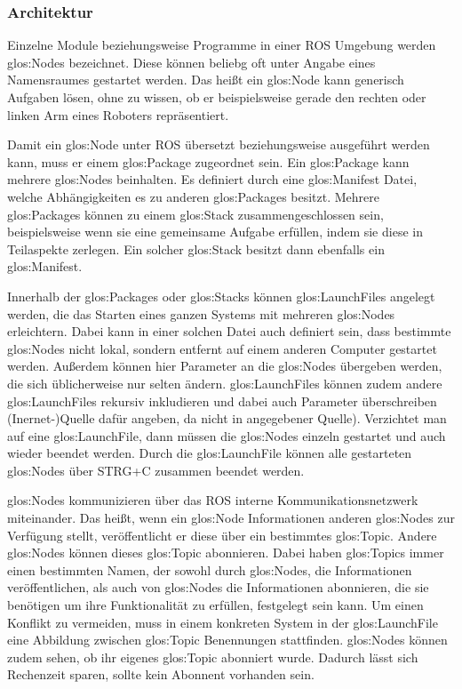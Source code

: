 \subsubsection{Architektur}

Einzelne Module beziehungsweise Programme in einer \gls{ROS} Umgebung werden \glspl{glos:Node} bezeichnet. Diese können beliebg oft unter Angabe eines Namensraumes gestartet werden. Das heißt ein \gls{glos:Node} kann generisch Aufgaben lösen, ohne zu wissen, ob er beispielsweise gerade den rechten oder linken Arm eines Roboters repräsentiert.

Damit ein \gls{glos:Node} unter \gls{ROS} übersetzt beziehungsweise ausgeführt werden kann, muss er einem \gls{glos:Package} zugeordnet sein. Ein \gls{glos:Package} kann mehrere \glspl{glos:Node} beinhalten. Es definiert durch eine \gls{glos:Manifest} Datei, welche Abhängigkeiten es zu anderen \glspl{glos:Package} besitzt. Mehrere \glspl{glos:Package} können zu einem \gls{glos:Stack} zusammengeschlossen sein, beispielsweise wenn sie eine gemeinsame Aufgabe erfüllen, indem sie diese in Teilaspekte zerlegen. Ein solcher \gls{glos:Stack} besitzt dann ebenfalls ein \gls{glos:Manifest}.

Innerhalb der \glspl{glos:Package} oder \glspl{glos:Stack} können \glspl{glos:LaunchFile} angelegt werden, die das Starten eines ganzen Systems mit mehreren \glspl{glos:Node} erleichtern. Dabei kann in einer solchen Datei auch definiert sein, dass bestimmte \glspl{glos:Node} nicht lokal, sondern entfernt auf einem anderen Computer gestartet werden. Außerdem können hier Parameter an die \glspl{glos:Node} übergeben werden, die sich üblicherweise nur selten ändern. \glspl{glos:LaunchFile} können zudem andere \glspl{glos:LaunchFile} rekursiv inkludieren und dabei auch Parameter überschreiben{\color{red} (Inernet-)Quelle dafür angeben, da nicht in angegebener Quelle)}. Verzichtet man auf eine \gls{glos:LaunchFile}, dann müssen die \glspl{glos:Node} einzeln gestartet und auch wieder beendet werden. Durch die \gls{glos:LaunchFile} können alle gestarteten \glspl{glos:Node} über STRG+C zusammen beendet werden.

\glspl{glos:Node} kommunizieren über das \gls{ROS} interne Kommunikationsnetzwerk miteinander. Das heißt, wenn ein \gls{glos:Node} Informationen anderen \glspl{glos:Node} zur Verfügung stellt, veröffentlicht er diese über ein bestimmtes \gls{glos:Topic}. Andere \glspl{glos:Node} können dieses \gls{glos:Topic} abonnieren. Dabei haben \glspl{glos:Topic} immer einen bestimmten Namen, der sowohl durch \glspl{glos:Node}, die Informationen veröffentlichen, als auch von \glspl{glos:Node} die Informationen abonnieren, die sie benötigen um ihre Funktionalität zu erfüllen, festgelegt sein kann. Um einen Konflikt zu vermeiden, muss in einem konkreten System in der \gls{glos:LaunchFile} eine Abbildung zwischen \gls{glos:Topic} Benennungen stattfinden. \glspl{glos:Node} können zudem sehen, ob ihr eigenes \gls{glos:Topic} abonniert wurde. Dadurch lässt sich Rechenzeit sparen, sollte kein Abonnent vorhanden sein.

